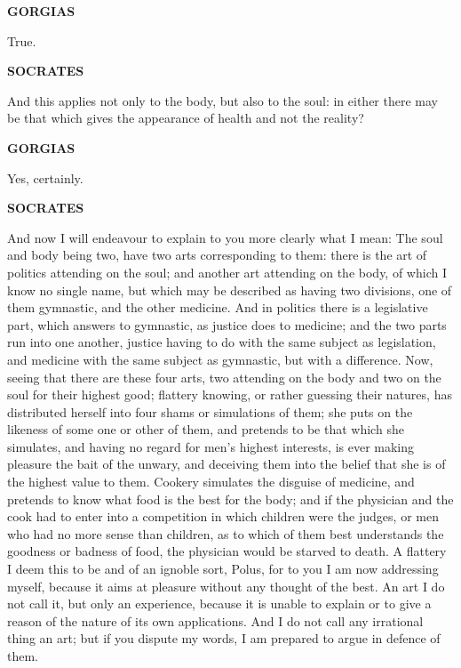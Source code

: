 \documentclass[11pt,letter]{article}
\begin{document}
\par \textbf{GORGIAS}
\par   True.

\par \textbf{SOCRATES}
\par   And this applies not only to the body, but also to the soul:  in either there may be that which gives the appearance of health and not the reality?

\par \textbf{GORGIAS}
\par   Yes, certainly.

\par \textbf{SOCRATES}
\par   And now I will endeavour to explain to you more clearly what I mean:  The soul and body being two, have two arts corresponding to them:  there is the art of politics attending on the soul; and another art attending on the body, of which I know no single name, but which may be described as having two divisions, one of them gymnastic, and the other medicine. And in politics there is a legislative part, which answers to gymnastic, as justice does to medicine; and the two parts run into one another, justice having to do with the same subject as legislation, and medicine with the same subject as gymnastic, but with a difference. Now, seeing that there are these four arts, two attending on the body and two on the soul for their highest good; flattery knowing, or rather guessing their natures, has distributed herself into four shams or simulations of them; she puts on the likeness of some one or other of them, and pretends to be that which she simulates, and having no regard for men’s highest interests, is ever making pleasure the bait of the unwary, and deceiving them into the belief that she is of the highest value to them. Cookery simulates the disguise of medicine, and pretends to know what food is the best for the body; and if the physician and the cook had to enter into a competition in which children were the judges, or men who had no more sense than children, as to which of them best understands the goodness or badness of food, the physician would be starved to death. A flattery I deem this to be and of an ignoble sort, Polus, for to you I am now addressing myself, because it aims at pleasure without any thought of the best. An art I do not call it, but only an experience, because it is unable to explain or to give a reason of the nature of its own applications. And I do not call any irrational thing an art; but if you dispute my words, I am prepared to argue in defence of them.
\end{document}
